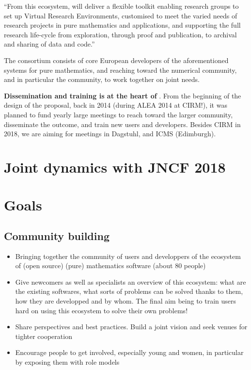 \documentclass[12pt]{amsbook}
\begin{document}
``From this ecosystem, \ODK will deliver a flexible toolkit enabling
research groups to set up Virtual Research Environments, customised to
meet the varied needs of research projects in pure mathematics and
applications, and supporting the full research life-cycle from
exploration, through proof and publication, to archival and sharing of
data and code.''

The \ODK  consortium consists of core European developers of the
aforementioned systems for pure mathematics, and reaching toward the
numerical community, and in particular the \Jupyter  community, to work
together on joint needs.

\textbf{Dissemination and training is at the heart of \ODK}. From the
beginning of the design of the proposal, back in 2014 (during ALEA
2014 at CIRM!), it was planned to fund yearly large meetings to reach
toward the larger community, disseminate the outcome, and train new
users and developers. Besides CIRM in 2018, we are aiming for meetings
in Dagstuhl, and ICMS (Edimburgh).


\section{Joint dynamics with JNCF 2018}

\section{Goals}

\subsection{Community building}
\begin{itemize}
\item{Bringing together the community of users and developpers of the
ecosystem of (open source) (pure) mathematics software (about 80 people)}

\item{Give newcomers as well as specialists an overview of this ecosystem:
what are the existing softwares, what sorts of problems can be solved thanks to them, how they are developped and by whom. The final aim being to train users hard
on using this ecosystem to solve their own problems!}

\item{Share perspectives and best practices. Build a joint vision and seek
venues for tighter cooperation}

\item{Encourage people to get involved, especially young and women, in
particular by exposing them with role models}
\end{itemize}
\end{document}
